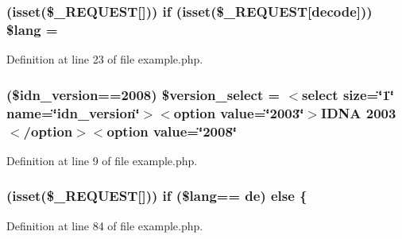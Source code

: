 \subsubsection[{\texorpdfstring{\$lang}{$lang}}]{ (isset(\$\+\_\+\+R\+E\+Q\+U\+E\+ST\mbox{[}\textquotesingle{}\mbox{]})) {\bf if} (isset(\$\+\_\+\+R\+E\+Q\+U\+E\+ST\mbox{[}\textquotesingle{}decode\textquotesingle{}\mbox{]})) \${\bf lang} = \textquotesingle{}}\hypertarget{example_8php_aef99014231eb219a8c774eb4b8463fd9}{}\label{example_8php_aef99014231eb219a8c774eb4b8463fd9}


Definition at line 23 of file example.\+php.

\subsubsection[{\texorpdfstring{\$version\+\_\+select}{$version_select}}]{ (\$idn\+\_\+version==2008) \$version\+\_\+select = \textquotesingle{}$<$select {\bf size}=\char`\"{}1\char`\"{} {\bf name}=\char`\"{}idn\+\_\+version\char`\"{}$>$$<$option {\bf value}=\char`\"{}2003\char`\"{}$>${\bf I\+D\+NA} 2003$<$/option$>$$<$option {\bf value}=\char`\"{}2008\char`\"{}\textquotesingle{}}\hypertarget{example_8php_a13d9753a348e3a016c3d8fb1ac173bbd}{}\label{example_8php_a13d9753a348e3a016c3d8fb1ac173bbd}


Definition at line 9 of file example.\+php.

\subsubsection[{\texorpdfstring{else}{else}}]{ (isset(\$\+\_\+\+R\+E\+Q\+U\+E\+ST\mbox{[}\textquotesingle{}\mbox{]})) {\bf if} (\${\bf lang}== \textquotesingle{}de\textquotesingle{}) else \{}\hypertarget{example_8php_a62bf8b36de1aa08b54e9822dc49899aa}{}\label{example_8php_a62bf8b36de1aa08b54e9822dc49899aa}


Definition at line 84 of file example.\+php.

